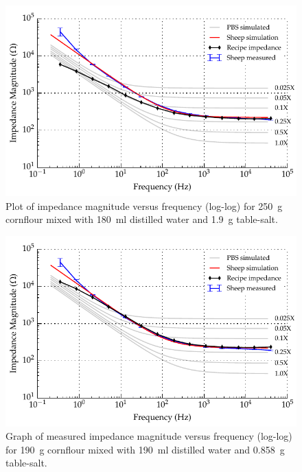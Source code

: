   \begin{figure}
    \centering
    \includegraphics[width=\textwidth]{content/pt2/graphics/run14_180ml-distilledWater_250g-cornflour_1g9-salt_ZVsF_graph_mag}
    \caption{\label{fig:recipe_cornflour_salt_extraWater_mag}Plot of impedance magnitude versus frequency (log-log) for \SI{250}{\gram} cornflour mixed with \SI{180}{\milli\litre} distilled water and \SI{1.9}{\gram} table-salt.}
  \end{figure}


  \begin{figure}
      \centering
      \includegraphics[width=\textwidth]{content/pt2/graphics/run12_190ml-distilledWater_190g-cornflour_0g858-salt_ZVsF_graph_mag}
      \caption{\label{fig:recipe_cornflour_salt_extraWater_mag_improved}Graph of measured impedance magnitude versus frequency (log-log) for \SI{190}{\gram} cornflour mixed with \SI{190}{\milli\litre} distilled water and \SI{0.858}{\gram} table-salt.}
  \end{figure}

